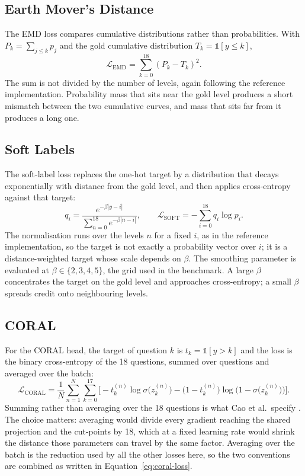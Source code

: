 \subsection{Earth Mover's Distance}

The EMD loss \cite{hou2017emd} compares cumulative distributions rather than probabilities.
With $P_k=\sum_{j\leq k}p_j$ and the gold cumulative distribution
$T_k = \mathbb{1}[y \leq k]$,
\begin{equation}
\mathcal{L}_{\text{EMD}} = \sum_{k=0}^{18}\left(P_k - T_k\right)^2 .
\end{equation}
The sum is not divided by the number of levels, again following the reference implementation.
Probability mass that sits near the gold level produces a short mismatch between the two
cumulative curves, and mass that sits far from it produces a long one.

\subsection{Soft Labels}

The soft-label loss \cite{bertinetto2020soft} replaces the one-hot target by a distribution
that decays exponentially with distance from the gold level, and then applies cross-entropy
against that target:
\begin{equation}
q_i = \frac{e^{-\beta|y-i|}}{\sum_{n=0}^{18} e^{-\beta |n-i|}}, \qquad
\mathcal{L}_{\text{SOFT}} = -\sum_{i=0}^{18} q_i \log p_i .
\end{equation}
The normalisation runs over the levels $n$ for a fixed $i$, as in the reference
implementation, so the target is not exactly a probability vector over $i$; it is a
distance-weighted target whose scale depends on $\beta$. The smoothing parameter is evaluated
at $\beta \in \{2,3,4,5\}$, the grid used in the benchmark. A large $\beta$ concentrates the
target on the gold level and approaches cross-entropy; a small $\beta$ spreads credit onto
neighbouring levels.

\subsection{CORAL}

For the CORAL head, the target of question $k$ is $t_k = \mathbb{1}[y>k]$ and the loss is the
binary cross-entropy of the 18 questions, summed over questions and averaged over the batch:
\begin{equation}
\mathcal{L}_{\text{CORAL}} = \frac{1}{N}\sum_{n=1}^{N}\sum_{k=0}^{17}
\Big[-t_k^{(n)}\log\sigma\big(z_k^{(n)}\big)
-\big(1-t_k^{(n)}\big)\log\big(1-\sigma\big(z_k^{(n)}\big)\big)\Big].
\label{eq:coral-loss}
\end{equation}
Summing rather than averaging over the 18 questions is what Cao et al.\ specify
\cite{cao2020coral}. The choice matters: averaging would divide every gradient reaching the
shared projection and the cut-points by 18, which at a fixed learning rate would shrink the
distance those parameters can travel by the same factor. Averaging over the batch is the
reduction used by all the other losses here, so the two conventions are combined as written in
Equation~\ref{eq:coral-loss}.

